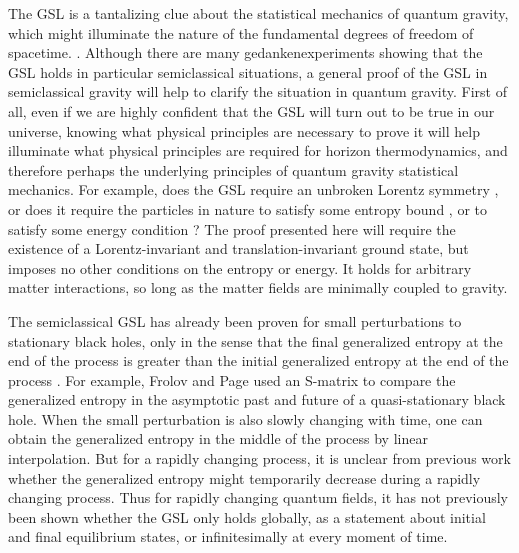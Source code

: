 \documentclass{article}
\begin{document}
The GSL is a tantalizing clue about the statistical mechanics of quantum gravity, which might illuminate the nature of the fundamental degrees of freedom of spacetime. \cite{sorkin83}\cite{JP07}.  Although there are many gedankenexperiments showing that the GSL holds in particular semiclassical situations, a general proof of the GSL in semiclassical gravity will help to clarify the situation in quantum gravity.  First of all, even if we are highly confident that the GSL will turn out to be true in our universe, knowing what physical principles are necessary to prove it will help illuminate what physical principles are required for horizon thermodynamics, and therefore perhaps the underlying principles of quantum gravity statistical mechanics.  For example, does the GSL require an unbroken Lorentz symmetry \cite{EFJW07}, or does it require the particles in nature to satisfy some entropy bound \cite{bounds}, or to satisfy some energy condition \cite{energy}?  The proof presented here will require the existence of a Lorentz-invariant and translation-invariant ground state, but imposes no other conditions on the entropy or energy.  It holds for arbitrary matter interactions, so long as the matter fields are minimally coupled to gravity.

The semiclassical GSL has already been proven for small perturbations to stationary black holes, only in the sense that the final generalized entropy at the end of the process is greater than the initial generalized entropy at the end of the process \cite{10proofs}.  For example, Frolov and Page \cite{FP93} used an S-matrix to compare the generalized entropy in the asymptotic past and future of a quasi-stationary black hole.  When the small perturbation is also slowly changing with time, one can obtain the generalized entropy in the middle of the process by linear interpolation.  But for a rapidly changing process, it is unclear from previous work whether the generalized entropy might temporarily decrease during a rapidly changing process.  Thus for rapidly changing quantum fields, it has not previously been shown whether the GSL only holds globally, as a statement about initial and final equilibrium states, or infinitesimally at every moment of time.
\end{document}
